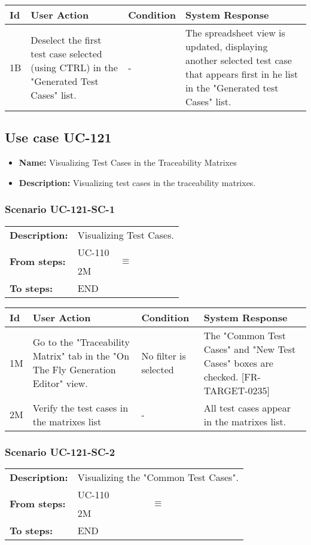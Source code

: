 \documentclass[a4paper,11pt]{article}
\newcommand{\bl}{\\ \hline}
\begin{document}
\begin{tabular}{|p{0.8in}|p{1.6in}|p{1.6in}|p{1.6in}|}
\hline
Id & User Action & Condition & System Response  \bl 
1B & Deselect the first test case selected (using CTRL) in the "Generated Test Cases" list. & - & The spreadsheet view is updated, displaying another selected test case that appears first in he list in the "Generated test Cases" list. \bl 
\end{tabular}
\subsection*{Use case UC-121}
\begin{itemize}
\item {\bf Name: }Visualizing Test Cases in the Traceability Matrixes
\item {\bf Description: }Visualizing test cases in the traceability matrixes.
\end{itemize}
\subsubsection*{Scenario UC-121-SC-1}
\begin{tabular}{p{1in}p{4in}}
{\bf Description:} & Visualizing Test Cases. \\
{\bf From steps:} & UC-110$$\equiv$$2M \\
{\bf To steps:} & END \\
\end{tabular}
 
\begin{tabular}{|p{0.8in}|p{1.6in}|p{1.6in}|p{1.6in}|}
\hline
Id & User Action & Condition & System Response  \bl 
1M & Go to the "Traceability Matrix" tab in the "On The Fly Generation Editor" view. & No filter is selected & The "Common Test Cases" and "New Test Cases" boxes are checked. [FR-TARGET-0235] \bl 
2M & Verify the test cases in the matrixes list & - & All test cases appear in the matrixes list. \bl 
\end{tabular}
\subsubsection*{Scenario UC-121-SC-2}
\begin{tabular}{p{1in}p{4in}}
{\bf Description:} & Visualizing the "Common Test Cases". \\
{\bf From steps:} & UC-110$$\equiv$$2M \\
{\bf To steps:} & END \\
\end{tabular}
 
\end{document}
